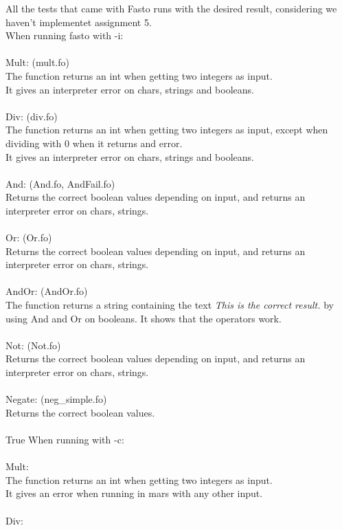 \documentclass{article}
\begin{document}
All the tests that came with Fasto runs with the desired result, considering we haven't implementet assignment 5.\\
When running fasto with -i:\\
\\
Mult: (mult.fo)\\
The function returns an int when getting two integers as input.\\
It gives an interpreter error on chars, strings and booleans.\\
\\
Div: (div.fo)\\
The function returns an int when getting two integers as input, except when dividing with 0 when it returns and error.\\
It gives an interpreter error on chars, strings and booleans.\\
\\
And: (And.fo, AndFail.fo)\\
Returns the correct boolean values depending on input, and returns an interpreter error on chars, strings.\\
\\
Or: (Or.fo)\\
Returns the correct boolean values depending on input, and returns an interpreter error on chars, strings.\\
\\
AndOr: (AndOr.fo)\\
The function returns a string containing the text \textit{This is the correct result.} by using And and Or on booleans. It shows that the operators work.\\
\\
Not: (Not.fo)\\
Returns the correct boolean values depending on input, and returns an interpreter error on chars, strings.\\
\\
Negate: (neg\_simple.fo)\\
Returns the correct boolean values.\\
\\
True
When running with -c:\\
\\
Mult:\\
The function returns an int when getting two integers as input.\\
It gives an error when running in mars with any other input.\\
\\
Div:\\
\end{document}
